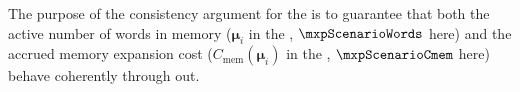 The purpose of the consistency argument for the \mxpMod{} is to guarantee that both
the active number of words in memory ($\bm{\mu}_i$ in the \cite{EYP}, $\mxpScenarioWords$ here) and
the accrued memory expansion cost ($C_\text{mem}(\bm{\mu}_i)$ in the \cite{EYP}, $\mxpScenarioCmem$ here)
behave coherently through out.

